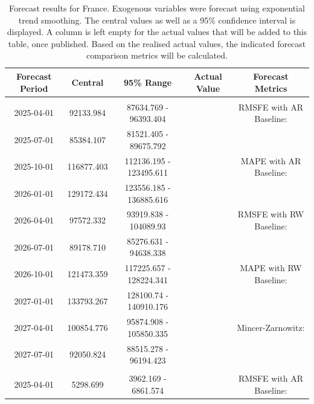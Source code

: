 \begin{table}
\centering
\caption{\label{tab:forecast_FR}Forecast results for France. Exogenous variables were forecast using exponential trend smoothing. The central values as well as a 95\% confidence interval is displayed. A column is left empty for the actual values that will be added to this table, once published. Based on the realised actual values, the indicated forecast comparison metrics will be calculated. }
\centering
\fontsize{7}{9}\selectfont
\begin{tabular}[t]{ccccc}
\toprule
Forecast Period & Central & 95\% Range & Actual Value & Forecast Metrics\\
\midrule
\addlinespace[0.3em]
\multicolumn{5}{l}{\textbf{ElectrCons}}\\
\hspace{1em}2025-04-01 & 92133.984 & 87634.769 - 96393.404 &  & RMSFE with AR Baseline:\\
\hspace{1em}2025-07-01 & 85384.107 & 81521.405 - 89675.792 &  & \\
\hspace{1em}2025-10-01 & 116877.403 & 112136.195 - 123495.611 &  & MAPE with AR Baseline:\\
\hspace{1em}2026-01-01 & 129172.434 & 123556.185 - 136885.616 &  & \\
\hspace{1em}2026-04-01 & 97572.332 & 93919.838 - 104089.93 &  & RMSFE with RW Baseline:\\
\hspace{1em}2026-07-01 & 89178.710 & 85276.631 - 94638.338 &  & \\
\hspace{1em}2026-10-01 & 121473.359 & 117225.657 - 128224.341 &  & MAPE with RW Baseline:\\
\hspace{1em}2027-01-01 & 133793.267 & 128100.74 - 140910.176 &  & \\
\hspace{1em}2027-04-01 & 100854.776 & 95874.908 - 105850.335 &  & Mincer-Zarnowitz:\\
\hspace{1em}2027-07-01 & 92050.824 & 88515.278 - 96194.423 &  & \\
\addlinespace[0.3em]
\multicolumn{5}{l}{\textbf{EmiCO2ElecHeat}}\\
\hspace{1em}2025-04-01 & 5298.699 & 3962.169 - 6861.574 &  & RMSFE with AR Baseline:\\

\end{tabular}
\end{table}
